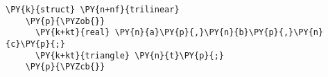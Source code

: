\begin{Verbatim}[commandchars=\\\{\}]
    \PY{k}{struct} \PY{n+nf}{trilinear}
    \PY{p}{\PYZob{}}
      \PY{k+kt}{real} \PY{n}{a}\PY{p}{,}\PY{n}{b}\PY{p}{,}\PY{n}{c}\PY{p}{;}
      \PY{k+kt}{triangle} \PY{n}{t}\PY{p}{;}
    \PY{p}{\PYZcb{}}
\end{Verbatim}

